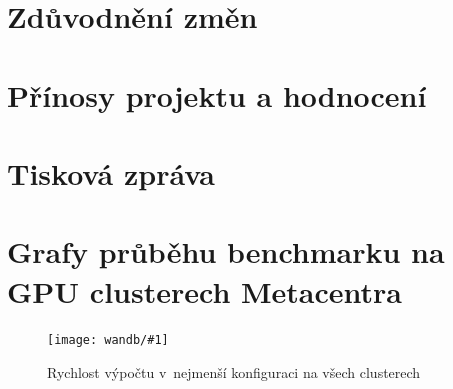 \documentclass[a4paper,11pt]{article}
\begin{document}










\section{Zdůvodnění změn}






\section{Přínosy projektu a hodnocení}



\section{Tisková zpráva}

\twocolumn
\appendix
\section{Grafy průběhu benchmarku na GPU clusterech Metacentra}

\def\graph#1#2{
\begin{figure}[h]
\begin{center}
\texttt{[image: wandb/\#1]}
\caption{#2}
\label{f:#1}
\end{center}
\end{figure}
}

\graph{all_6_6_300_1_64_32}{Rychlost výpočtu v~nejmenší konfiguraci na všech clusterech}
\end{document}
